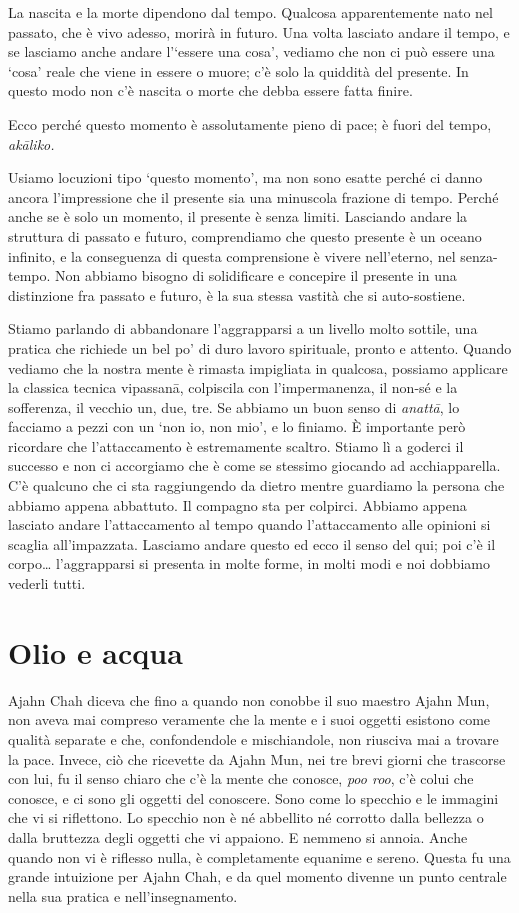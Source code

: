 La nascita e la morte dipendono dal tempo. Qualcosa apparentemente nato nel passato, che è vivo adesso, morirà in futuro. Una volta lasciato andare il tempo, e se lasciamo anche andare l'`essere una cosa', vediamo che non ci può essere una `cosa' reale che viene in essere o muore; c'è solo la quiddità del presente. In questo modo non c'è nascita o morte che debba essere fatta finire.

Ecco perché questo momento è assolutamente pieno di pace; è fuori del tempo, \textit{akāliko.}

Usiamo locuzioni tipo `questo momento', ma non sono esatte perché ci danno ancora l'impressione che il presente sia una minuscola frazione di tempo. Perché anche se è solo un momento, il presente è senza limiti. Lasciando andare la struttura di passato e futuro, comprendiamo che questo presente è un oceano infinito, e la conseguenza di questa comprensione è vivere nell'eterno, nel senza-tempo. Non abbiamo bisogno di solidificare e concepire il presente in una distinzione fra passato e futuro, è la sua stessa vastità che si auto-sostiene.

Stiamo parlando di abbandonare l'aggrapparsi a un livello molto sottile, una pratica che richiede un bel po' di duro lavoro spirituale, pronto e attento. Quando vediamo che la nostra mente è rimasta impigliata in qualcosa, possiamo applicare la classica tecnica vipassanā, colpiscila con l'impermanenza, il non-sé e la sofferenza, il vecchio un, due, tre. Se abbiamo un buon senso di \textit{anattā}, lo facciamo a pezzi con un `non io, non mio', e lo finiamo. È importante però ricordare che l'attaccamento è estremamente scaltro. Stiamo lì a goderci il successo e non ci accorgiamo che è come se stessimo giocando ad acchiapparella. C'è qualcuno che ci sta raggiungendo da dietro mentre guardiamo la persona che abbiamo appena abbattuto. Il compagno sta per colpirci. Abbiamo appena lasciato andare l'attaccamento al tempo quando l'attaccamento alle opinioni si scaglia all'impazzata. Lasciamo andare questo ed ecco il senso del qui; poi c'è il corpo\ldots{} l'aggrapparsi si presenta in molte forme, in molti modi e noi dobbiamo vederli tutti.

\section*{Olio e acqua}

Ajahn Chah diceva che fino a quando non conobbe il suo maestro Ajahn Mun, non aveva mai compreso veramente che la mente e i suoi oggetti esistono come qualità separate e che, confondendole e mischiandole, non riusciva mai a trovare la pace. Invece, ciò che ricevette da Ajahn Mun, nei tre brevi giorni che trascorse con lui, fu il senso chiaro che c'è la mente che conosce, \textit{poo roo}, c'è colui che conosce, e ci sono gli oggetti del conoscere. Sono come lo specchio e le immagini che vi si riflettono. Lo specchio non è né abbellito né corrotto dalla bellezza o dalla bruttezza degli oggetti che vi appaiono. E nemmeno si annoia. Anche quando non vi è riflesso nulla, è completamente equanime e sereno. Questa fu una grande intuizione per Ajahn Chah, e da quel momento divenne un punto centrale nella sua pratica e nell'insegnamento.

